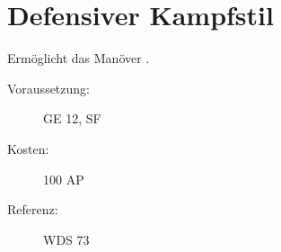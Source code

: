 \section{Defensiver Kampfstil}
\label{sf.defensiver_kampfstil}
Ermöglicht das Manöver .
\begin{description}
    \item[Voraussetzung:]
        GE 12, SF 
    \item [Kosten:]
        100 AP
    \item [Referenz:]
        WDS 73
\end{description}
